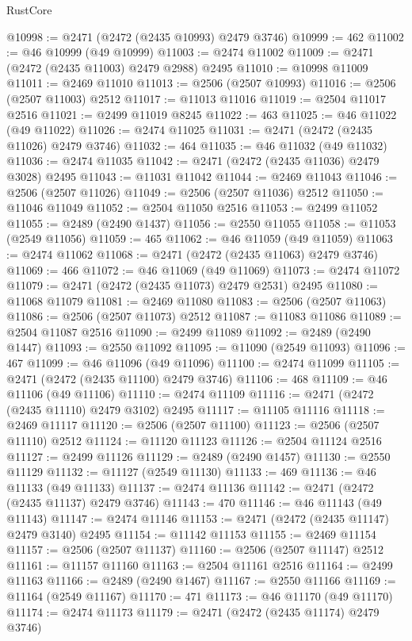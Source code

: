 \begin{lexlean}{RustCore}
\begin{coremodule}
@10998 := @2471 (@2472 (@2435 @10993) @2479 @3746)
@10999 := 462
@11002 := @46 @10999 (@49 @10999)
@11003 := @2474 @11002
@11009 := @2471 (@2472 (@2435 @11003) @2479 @2988) @2495
@11010 := @10998 @11009
@11011 := @2469 @11010
@11013 := @2506 (@2507 @10993)
@11016 := @2506 (@2507 @11003) @2512
@11017 := @11013 @11016
@11019 := @2504 @11017 @2516
@11021 := @2499 @11019 @8245
@11022 := 463
@11025 := @46 @11022 (@49 @11022)
@11026 := @2474 @11025
@11031 := @2471 (@2472 (@2435 @11026) @2479 @3746)
@11032 := 464
@11035 := @46 @11032 (@49 @11032)
@11036 := @2474 @11035
@11042 := @2471 (@2472 (@2435 @11036) @2479 @3028) @2495
@11043 := @11031 @11042
@11044 := @2469 @11043
@11046 := @2506 (@2507 @11026)
@11049 := @2506 (@2507 @11036) @2512
@11050 := @11046 @11049
@11052 := @2504 @11050 @2516
@11053 := @2499 @11052
@11055 := @2489 (@2490 @1437)
@11056 := @2550 @11055
@11058 := @11053 (@2549 @11056)
@11059 := 465
@11062 := @46 @11059 (@49 @11059)
@11063 := @2474 @11062
@11068 := @2471 (@2472 (@2435 @11063) @2479 @3746)
@11069 := 466
@11072 := @46 @11069 (@49 @11069)
@11073 := @2474 @11072
@11079 := @2471 (@2472 (@2435 @11073) @2479 @2531) @2495
@11080 := @11068 @11079
@11081 := @2469 @11080
@11083 := @2506 (@2507 @11063)
@11086 := @2506 (@2507 @11073) @2512
@11087 := @11083 @11086
@11089 := @2504 @11087 @2516
@11090 := @2499 @11089
@11092 := @2489 (@2490 @1447)
@11093 := @2550 @11092
@11095 := @11090 (@2549 @11093)
@11096 := 467
@11099 := @46 @11096 (@49 @11096)
@11100 := @2474 @11099
@11105 := @2471 (@2472 (@2435 @11100) @2479 @3746)
@11106 := 468
@11109 := @46 @11106 (@49 @11106)
@11110 := @2474 @11109
@11116 := @2471 (@2472 (@2435 @11110) @2479 @3102) @2495
@11117 := @11105 @11116
@11118 := @2469 @11117
@11120 := @2506 (@2507 @11100)
@11123 := @2506 (@2507 @11110) @2512
@11124 := @11120 @11123
@11126 := @2504 @11124 @2516
@11127 := @2499 @11126
@11129 := @2489 (@2490 @1457)
@11130 := @2550 @11129
@11132 := @11127 (@2549 @11130)
@11133 := 469
@11136 := @46 @11133 (@49 @11133)
@11137 := @2474 @11136
@11142 := @2471 (@2472 (@2435 @11137) @2479 @3746)
@11143 := 470
@11146 := @46 @11143 (@49 @11143)
@11147 := @2474 @11146
@11153 := @2471 (@2472 (@2435 @11147) @2479 @3140) @2495
@11154 := @11142 @11153
@11155 := @2469 @11154
@11157 := @2506 (@2507 @11137)
@11160 := @2506 (@2507 @11147) @2512
@11161 := @11157 @11160
@11163 := @2504 @11161 @2516
@11164 := @2499 @11163
@11166 := @2489 (@2490 @1467)
@11167 := @2550 @11166
@11169 := @11164 (@2549 @11167)
@11170 := 471
@11173 := @46 @11170 (@49 @11170)
@11174 := @2474 @11173
@11179 := @2471 (@2472 (@2435 @11174) @2479 @3746)

\end{coremodule}
\end{lexlean}
